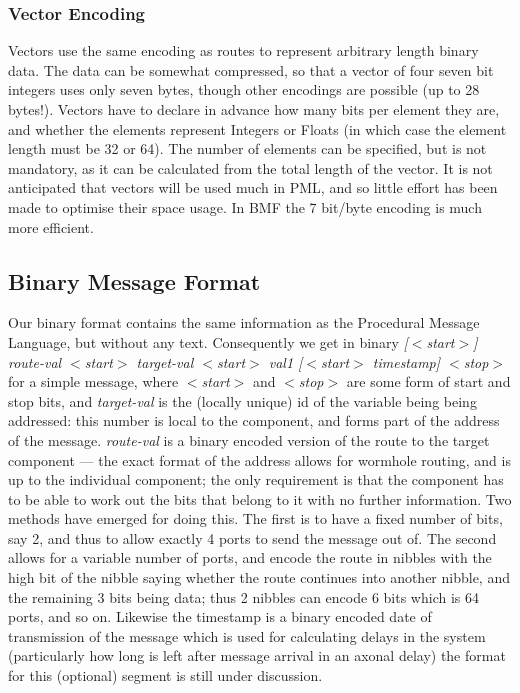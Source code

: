 \documentclass[pdftex,a4paper]{article}
\begin{document}
\subsubsection{Vector Encoding}

Vectors use the same encoding as routes to represent arbitrary length
binary data. The data can be somewhat compressed, so that a vector of
four seven bit integers uses only seven bytes, though other encodings
are possible (up to 28 bytes!). Vectors have to declare in advance how
many bits per element they are, and whether the elements represent
Integers or Floats (in which case the element length must be 32 or
64). The number of elements can be specified, but is not mandatory, as
it can be calculated from the total length of the vector. It is not
anticipated that vectors will be used much in PML, and so little
effort has been made to optimise their space usage. In BMF the 7
bit/byte encoding is much more efficient.

\subsection{Binary Message Format}

Our binary format contains the same information as the Procedural
Message Language, but without any text. Consequently we get in binary
{\em [$<$start$>$] route-val $<$start$>$ target-val $<$start$>$ val1
[$<$start$>$ timestamp] $<$stop$>$} for a simple message, where {\em
$<$start$>$} and {\em $<$stop$>$} are some form of start and stop
bits, and {\em target-val} is the (locally unique) id of the variable
being being addressed: this number is local to the component, and
forms part of the address of the message. {\em route-val} is a binary
encoded version of the route to the target component --- the exact
format of the address allows for wormhole routing, and is up to the
individual component; the only requirement is that the component has
to be able to work out the bits that belong to it with no further
information. Two methods have emerged for doing this. The first is to
have a fixed number of bits, say 2, and thus to allow exactly 4 ports
to send the message out of. The second allows for a variable number of
ports, and encode the route in nibbles with the high bit of the
nibble saying whether the route continues into another nibble, and the
remaining 3 bits being data; thus 2 nibbles can encode 6 bits which is
64 ports, and so on. Likewise the timestamp is a binary encoded date
of transmission of the message which is used for calculating delays in
the system (particularly how long is left after message arrival in an
axonal delay) the format for this (optional) segment is still under
discussion.
\end{document}
